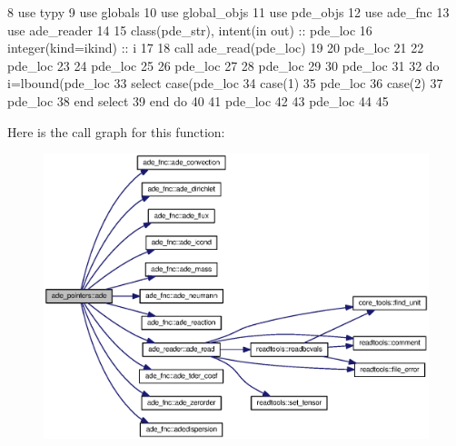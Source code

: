 \begin{DoxyCode}
8       \textcolor{keywordtype}{use }typy
9       \textcolor{keywordtype}{use }globals
10       \textcolor{keywordtype}{use }global_objs
11       \textcolor{keywordtype}{use }pde_objs
12       \textcolor{keywordtype}{use }ade_fnc
13       \textcolor{keywordtype}{use }ade_reader
14       
15       \textcolor{keywordtype}{class}(pde_str), \textcolor{keywordtype}{intent(in out)} :: pde\_loc
16       \textcolor{keywordtype}{integer(kind=ikind)} :: i
17       
18       \textcolor{keyword}{call }ade_read(pde\_loc)
19             
20       pde\_loc%
21       
22       pde\_loc%
23 
24       pde\_loc%
25 
26       pde\_loc%
27 
28       pde\_loc%
29             
30       pde\_loc%
31           
32       \textcolor{keywordflow}{do} i=lbound(pde\_loc%
33         \textcolor{keywordflow}{select case}(pde\_loc%
34           \textcolor{keywordflow}{case}(1)
35             pde\_loc%
36           \textcolor{keywordflow}{case}(2)
37             pde\_loc%
38 \textcolor{keywordflow}{        end select}
39 \textcolor{keywordflow}{      end do}    
40         
41       pde\_loc%
42       
43       pde\_loc%
44       
45     
\end{DoxyCode}


Here is the call graph for this function\+:\nopagebreak
\begin{figure}[H]
\begin{center}
\leavevmode
\includegraphics[width=350pt]{namespaceade__pointers_adcdbd3c086467f4845b54788e253d694_cgraph}
\end{center}
\end{figure}




